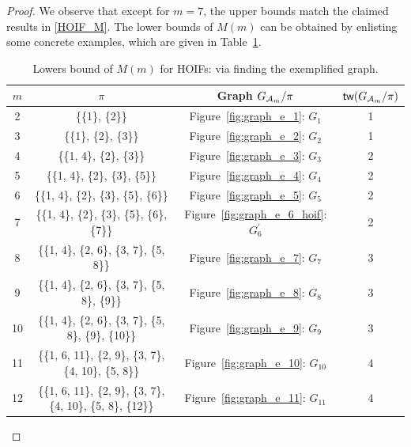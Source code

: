 \documentclass[letterpaper,11pt]{article}
\newcommand{\treewidthp}[1]{\mathsf{tw}(#1)}
\newcommand{\graphform}[1]{G_{#1}}
\begin{document}
\begin{bibunit}[plainnat]
\begin{proof}
We observe that except for $m=7$, the upper bounds match the claimed results in \eqref{HOIF_M}. The lower bounds of $M(m)$ can be obtained by enlisting some concrete examples, which are given in Table~\ref{tab:HOIF_lower_bound}. 

\begin{table}[h]
\centering
\caption{Lowers bound of $M(m)$ for HOIFs: via finding the exemplified graph.}
\label{tab:HOIF_lower_bound}
\begin{tabular}{c c c c}
\toprule
$m$ & $\pi$ & Graph $\graphform{\calA_{m}} /\pi$ & $\treewidthp{\graphform{\calA_{m}} /\pi}$ \\
\midrule
2  & \{\{1\}, \{2\}\} & Figure~\ref{fig:graph_e_1}: $G_1$ & 1 \\
3  & \{\{1\}, \{2\}, \{3\}\} & Figure~\ref{fig:graph_e_2}: $G_2$ & 1 \\
4  & \{\{1, 4\}, \{2\}, \{3\}\} & Figure~\ref{fig:graph_e_3}: $G_3$ & 2 \\
5  & \{\{1, 4\}, \{2\}, \{3\}, \{5\}\} & Figure~\ref{fig:graph_e_4}: $G_4$ & 2 \\
6  & \{\{1, 4\}, \{2\}, \{3\}, \{5\}, \{6\}\} & Figure~\ref{fig:graph_e_5}: $G_5$ & 2 \\
7  & \{\{1, 4\}, \{2\}, \{3\}, \{5\}, \{6\}, \{7\}\} & Figure~\ref{fig:graph_e_6_hoif}: $G_6^{\prime}$ & 2 \\
8  & \{\{1, 4\}, \{2, 6\}, \{3, 7\}, \{5, 8\}\} & Figure~\ref{fig:graph_e_7}: $G_7$ & 3 \\
9  & \{\{1, 4\}, \{2, 6\}, \{3, 7\}, \{5, 8\}, \{9\}\} & Figure~\ref{fig:graph_e_8}: $G_8$ & 3 \\
10 & \{\{1, 4\}, \{2, 6\}, \{3, 7\}, \{5, 8\}, \{9\}, \{10\}\} & Figure~\ref{fig:graph_e_9}: $G_9$ & 3 \\
11 & \{\{1, 6, 11\}, \{2, 9\}, \{3, 7\}, \{4, 10\}, \{5, 8\}\} & Figure~\ref{fig:graph_e_10}: $G_{10}$ & 4 \\
12 & \{\{1, 6, 11\}, \{2, 9\}, \{3, 7\}, \{4, 10\}, \{5, 8\}, \{12\}\} & Figure~\ref{fig:graph_e_11}: $G_{11}$ & 4 \\
\bottomrule
\end{tabular}
\end{table}



\end{proof}
\end{bibunit}
\end{document}
